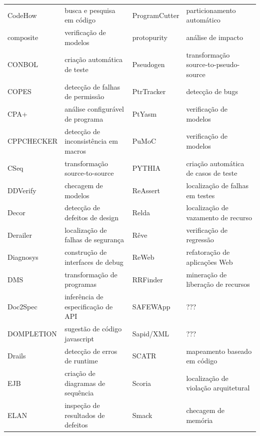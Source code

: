 \begin{table}[h]
{\begin{tabular}{| l | l | l | l |}
  CodeHow        & busca e pesquisa em código           & ProgramCutter    & particionamento automático           \\
  composite      & verificação de modelos               & protopurity      & análise de impacto                   \\
  CONBOL         & criação automática de teste          & Pseudogen        & transformação source-to-pseudo-source \\
  COPES          & detecção de falhas de permissão      & PtrTracker       & detecção de bugs                     \\
  CPA+           & análise configurável de programa     & PtYasm           & verificação de modelos               \\
  CPPCHECKER     & detecção de inconsistência em macros & PuMoC            & verificação de modelos               \\
  CSeq           & transformação source-to-source       & PYTHIA           & criação automática de casos de teste \\
  DDVerify       & checagem de modelos                  & ReAssert         & localização de falhas em testes      \\
  Decor          & detecção de defeitos de design       & Relda            & localização de vazamento de recurso  \\
  Derailer       & localização de falhas de segurança   & Rêve             & verificação de regressão             \\
  Diagnosys      & construção de interfaces de debug    & ReWeb            & refatoração de aplicações Web        \\
  DMS            & transformação de programas           & RRFinder         & mineração de liberação de recursos   \\
  Doc2Spec       & inferência de especificação de API   & SAFEWApp         & ???                                  \\
  DOMPLETION     & sugestão de código javascript        & Sapid/XML        & ???                                  \\
  Drails         & detecção de erros de runtime         & SCATR            & mapeamento baseado em código         \\
  EJB            & criação de diagramas de sequência    & Scoria           & localização de violação arquitetural \\
  ELAN           & inspeção de resultados de defeitos   & Smack            & checagem de memória                  \\

\end{tabular}}
\end{table}
